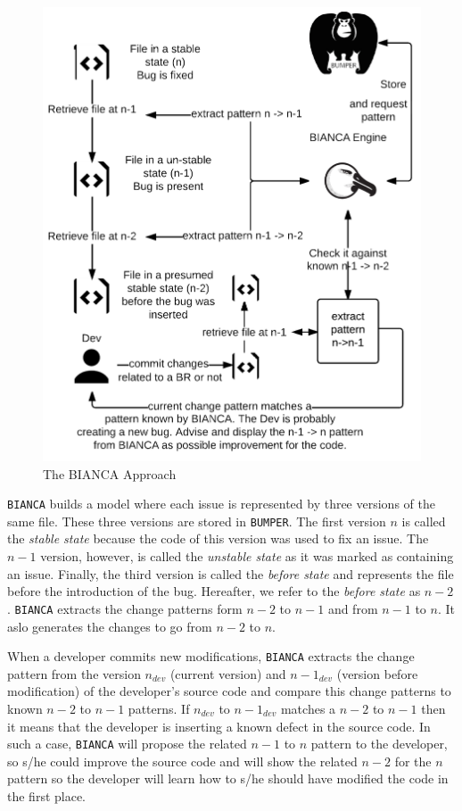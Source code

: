 \begin{figure}[h!]
  \centering
    \includegraphics{media/bianca-approach.png}
    \caption{The BIANCA Approach
    \label{fig:bianca-approach}}
\end{figure}

{\tt BIANCA} builds a model where each issue is represented by three versions of the same file.
These three versions are stored in {\tt BUMPER}.
The first version $n$ is called the {\it stable state} because the code of this version was used to fix an issue.
The $n-1$ version, however, is called the {\it unstable state} as it was marked as containing an issue.
Finally, the third version is called the {\it before state} and represents the file before the introduction of the bug.
Hereafter, we refer to the {\it before state} as $n-2$.
{\tt BIANCA} extracts the change patterns form $n-2$ to $n-1$ and from $n-1$ to $n$.
It aslo generates the changes to go from $n-2$ to $n$.

When a developer commits new modifications, {\tt BIANCA} extracts the change pattern from the version $n_{dev}$ (current version) and $n-1_{dev}$ (version before modification) of the developer's source code and compare this change patterns to known $n-2$ to $n-1$ patterns.
If $n_{dev}$ to $n-1_{dev}$ matches a $n-2$ to $n-1$ then it means that the developer is inserting a known defect in the source code.
In such a case, {\tt BIANCA} will propose the related $n-1$ to $n$ pattern to the developer, so s/he could improve the source code and will show the related $n-2$ for the $n$ pattern so the developer will learn how to s/he should have modified the code in the first place.

